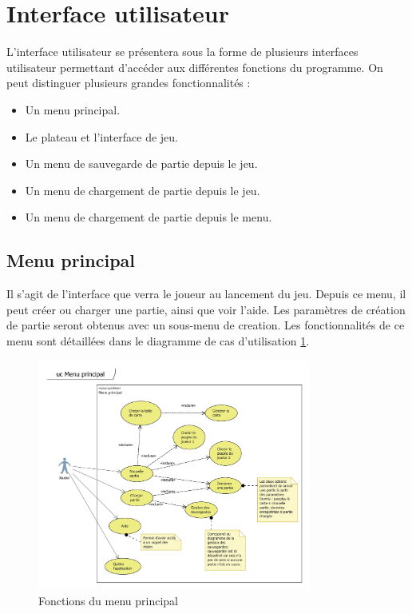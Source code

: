 \section{Interface utilisateur}
L'interface utilisateur se présentera sous la forme de plusieurs interfaces utilisateur permettant d'accéder aux différentes fonctions du programme.
On peut distinguer plusieurs grandes fonctionnalités :
\begin{itemize}
  \item Un menu principal.
  \item Le plateau et l'interface de jeu.
  \item Un menu de sauvegarde de partie depuis le jeu.
  \item Un menu de chargement de partie depuis le jeu.
  \item Un menu de chargement de partie depuis le menu.
\end{itemize} 

\subsection{Menu principal}
Il s'agit de l'interface que verra le joueur au lancement du jeu. 
Depuis ce menu, il peut créer ou charger une partie, ainsi que voir l'aide.
Les paramètres de création de partie seront obtenus avec un sous-menu de creation.
Les fonctionnalités de ce menu sont détaillées dans le diagramme de cas d'utilisation \ref{fig:useCaseMainMenu}.
\begin{figure}[h!]
    \centering
    \includegraphics[width=0.8\textwidth]{res/MenuPrincipal.png}
    \caption{Fonctions du menu principal}
    \label{fig:useCaseMainMenu}
\end{figure}


